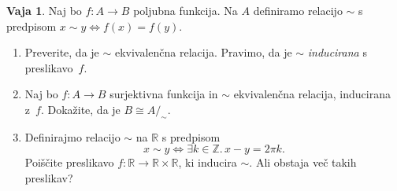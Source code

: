 \documentclass{article}
\newcommand{\some}[1]{\exists #1 .\,}
\newcommand{\NN}{\mathbb{N}}
\newcommand{\ZZ}{\mathbb{Z}}
\newcommand{\RR}{\mathbb{R}}
\theoremstyle{definition}
\newtheorem{vaja}{Vaja}
\begin{document}
\begin{vaja}
	Naj bo $f\colon A \to B$ poljubna funkcija. Na $A$ definiramo relacijo $\sim$ s predpisom $x \sim y \iff f(x) = f(y)$.
	\begin{enumerate}
		\item
		Preverite, da je $\sim$ ekvivalenčna relacija. Pravimo, da je $\sim$ \emph{inducirana} s preslikavo~$f$.
		\item
		Naj bo $f\colon A \to B$ surjektivna funkcija in $\sim$ ekvivalenčna relacija, inducirana z~$f$. Dokažite, da je $B \cong A/_\sim$.
		\item
		Definirajmo relacijo $\sim$ na $\RR$ s predpisom
		\begin{equation*}
			x \sim y \iff \some{k \in \ZZ}{x - y = 2 \pi k}.
		\end{equation*}
		Poiščite preslikavo $f\colon \RR \to \RR \times \RR$, ki inducira $\sim$. Ali obstaja več takih preslikav?
	\end{enumerate}
\end{vaja}



\end{document}
